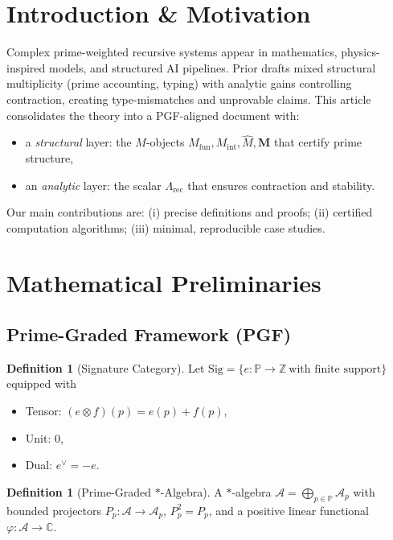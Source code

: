 \documentclass[11pt]{article}
\newcommand{\Sig}{\mathrm{Sig}}
\newcommand{\Mfun}{M_{\mathrm{fun}}}
\newcommand{\Mint}{M_{\mathrm{int}}}
\newcommand{\Mhat}{\widehat{M}}
\newcommand{\Mdiag}{\mathbf{M}}
\newcommand{\Lrec}{\Lambda_{\mathrm{rec}}}
\newcommand{\PGalgebra}{\mathcal{A}}
\newcommand{\PGprojector}{P}
\newcommand{\PGstate}{\varphi}
\theoremstyle{definition}
\newtheorem{definition}[theorem]{Definition}
\begin{document}
\section{Introduction \& Motivation}
Complex prime-weighted recursive systems appear in mathematics, physics-inspired models, and structured AI pipelines. Prior drafts mixed structural multiplicity (prime accounting, typing) with analytic gains controlling contraction, creating type-mismatches and unprovable claims. This article consolidates the theory into a PGF-aligned document with:
\begin{itemize}[leftmargin=*,nosep]
  \item a \emph{structural} layer: the $M$-objects $\Mfun,\Mint,\Mhat,\Mdiag$ that certify prime structure,
  \item an \emph{analytic} layer: the scalar $\Lrec$ that ensures contraction and stability.
\end{itemize}
Our main contributions are: (i) precise definitions and proofs; (ii) certified computation algorithms; (iii) minimal, reproducible case studies.

\section{Mathematical Preliminaries}
\subsection{Prime-Graded Framework (PGF)}
\begin{definition}[Signature Category]
Let $\Sig=\{e:\mathbb{P}\to\mathbb{Z}\ \text{with finite support}\}$ equipped with
\begin{itemize}[leftmargin=*,nosep]
  \item Tensor: $(e\otimes f)(p)=e(p)+f(p)$,
  \item Unit: $0$,
  \item Dual: $e^\vee=-e$.
\end{itemize}
\end{definition}

\begin{definition}[Prime-Graded $*$-Algebra]
A $*$-algebra $\PGalgebra=\bigoplus_{p\in\mathbb{P}}\PGalgebra_p$ with bounded projectors $\PGprojector_p:\PGalgebra\to\PGalgebra_p$, $\PGprojector_p^2=\PGprojector_p$, and a positive linear functional $\PGstate:\PGalgebra\to\mathbb{C}$.
\end{definition}
\end{document}

